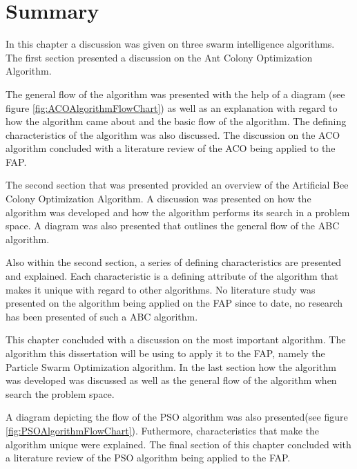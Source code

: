\section{Summary}
In this chapter a discussion was given on three swarm intelligence algorithms. The first section presented a discussion on the Ant Colony Optimization Algorithm.

The general flow of the algorithm was presented with the help of a diagram (see figure \ref{fig:ACOAlgorithmFlowChart}) as well as an explanation with regard to how the algorithm came about and the basic flow of the algorithm. The defining characteristics of the algorithm was also discussed. The discussion on the ACO algorithm concluded with a literature review of the ACO being applied to the FAP.

The second section that was presented provided an overview of the Artificial Bee Colony Optimization Algorithm. A discussion was presented on how the algorithm was developed and how the algorithm performs its search in a problem space. A diagram was also presented that outlines the general flow of the ABC algorithm.

Also within the second section, a series of defining characteristics are presented and explained. Each characteristic is a defining attribute of the algorithm that makes it unique with regard to other algorithms. No literature study was presented on the algorithm being applied on the FAP since to date, no research has been presented of such a ABC algorithm.

This chapter concluded with a discussion on the most important algorithm. The algorithm this dissertation will be using to apply it to the FAP, namely the Particle Swarm Optimization algorithm. In the last section how the algorithm was developed was discussed as well as the general flow of the algorithm when search the problem space.

A diagram depicting the flow of the PSO algorithm was also presented(see figure \ref{fig:PSOAlgorithmFlowChart}). Futhermore, characteristics that make the algorithm unique were explained. The final section of this chapter concluded with a literature review of the PSO algorithm being applied to the FAP.
